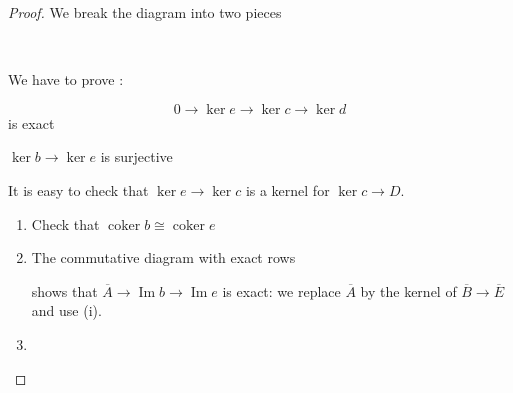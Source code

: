 \documentclass[5pt]{article}
\theoremstyle{definition}
\theoremstyle{remark}
\renewcommand{\bar}[1]{\overline{#1}}
\DeclareMathOperator{\coker}{coker}
\DeclareMathOperator{\Img}{Im}
\begin{document}
	\begin{proof}
		We break the diagram into two pieces \\
		\begin{center}
			 \ \ \ \ \ \ \
		\end{center}
		We have to prove : 
		\begin{proofenum}
			\item 
				\begin{equation}
					0 \rightarrow \ker e \rightarrow \ker c \rightarrow \ker d 
				\end{equation} is exact
			\item 
				$\ker b \rightarrow \ker e$ is surjective
		\end{proofenum}
		\begin{proofenum}
			\item 
				It is easy to check that $\ker e \rightarrow \ker c$ is a kernel for $\ker c \rightarrow D$.
			\item
				\begin{enumerate}
					\item
						Check that $\coker b \cong \coker e$
					\item
						The commutative diagram with exact rows
						\begin{center}
						\end{center}
						shows that $\bar{A} \rightarrow \Img b \rightarrow \Img e$ is exact: we replace $\bar{A}$ by the kernel of $\bar{B} \rightarrow \bar{E}$ and use (i).
					\item 

\end{enumerate}
\end{proofenum}
\end{proof}
\end{document}
